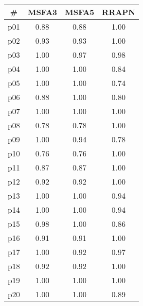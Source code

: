 \begin{tabular}{cccc}
\toprule
\textbf{\#} & \textbf{MSFA3} & \textbf{MSFA5} & \textbf{RRAPN}\\
\midrule
p01 & 0.88 & 0.88 & 1.00\\
p02 & 0.93 & 0.93 & 1.00\\
p03 & 1.00 & 0.97 & 0.98\\
p04 & 1.00 & 1.00 & 0.84\\
p05 & 1.00 & 1.00 & 0.74\\
p06 & 0.88 & 1.00 & 0.80\\
p07 & 1.00 & 1.00 & 1.00\\
p08 & 0.78 & 0.78 & 1.00\\
p09 & 1.00 & 0.94 & 0.78\\
p10 & 0.76 & 0.76 & 1.00\\
p11 & 0.87 & 0.87 & 1.00\\
p12 & 0.92 & 0.92 & 1.00\\
p13 & 1.00 & 1.00 & 0.94\\
p14 & 1.00 & 1.00 & 0.94\\
p15 & 0.98 & 1.00 & 0.86\\
p16 & 0.91 & 0.91 & 1.00\\
p17 & 1.00 & 0.92 & 0.97\\
p18 & 0.92 & 0.92 & 1.00\\
p19 & 1.00 & 1.00 & 1.00\\
p20 & 1.00 & 1.00 & 0.89\\
\bottomrule
\end{tabular}

